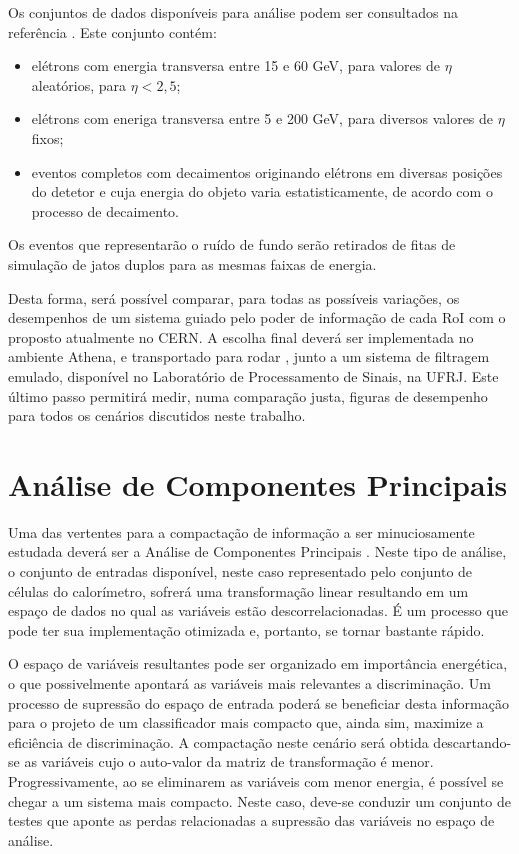 Os conjuntos de dados disponíveis para análise podem ser consultados na
referência \cite{egamma-samples}. Este conjunto contém:

\begin{itemize}
\item elétrons com energia transversa entre 15 e 60 GeV, para valores de
$\eta$ aleatórios, para $\eta < 2,5$;
\item elétrons com eneriga transversa entre 5 e 200 GeV, para diversos valores
de $\eta$ fixos;
\item eventos completos com decaimentos originando elétrons em diversas
posições do detetor e cuja energia do objeto varia estatisticamente, de acordo
com o processo de decaimento.
\end{itemize}  

Os eventos que representarão o ruído de fundo serão retirados de fitas de
simulação de jatos duplos para as mesmas faixas de energia.

Desta forma, será possível comparar, para todas as possíveis variações, os
desempenhos de um sistema guiado pelo poder de informação de cada RoI com o
proposto atualmente no CERN. A escolha final deverá ser implementada no
ambiente Athena, e transportado para rodar , junto a um sistema de
filtragem emulado, disponível no Laboratório de Processamento de Sinais, na
UFRJ. Este último passo permitirá medir, numa comparação justa, figuras de
desempenho para todos os cenários discutidos neste trabalho.

\section{Análise de Componentes Principais}

Uma das vertentes para a compactação de informação a ser minuciosamente
estudada deverá ser a Análise de Componentes Principais \cite{widrow,
vantrees}. Neste tipo de análise, o conjunto de entradas disponível, neste
caso representado pelo conjunto de células do calorímetro, sofrerá uma
transformação linear resultando em um espaço de dados no qual as variáveis
estão descorrelacionadas. É um processo que pode ter sua implementação
otimizada e, portanto, se tornar bastante rápido.

O espaço de variáveis resultantes pode ser organizado em importância
energética, o que possivelmente apontará as variáveis mais relevantes a
discriminação. Um processo de supressão do espaço de entrada poderá se
beneficiar desta informação para o projeto de um classificador mais compacto
que, ainda sim, maximize a eficiência de discriminação. A compactação neste
cenário será obtida descartando-se as variáveis cujo o auto-valor da matriz de
transformação é menor. Progressivamente, ao se eliminarem as variáveis com
menor energia, é possível se chegar a um sistema mais compacto. Neste caso,
deve-se conduzir um conjunto de testes que aponte as perdas relacionadas a
supressão das variáveis no espaço de análise.

